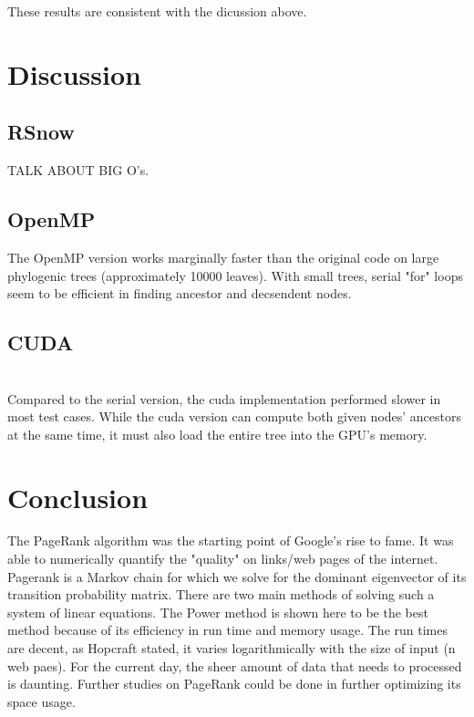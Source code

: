 \documentclass[11pt,letterpaper]{article}
\begin{document}
These results are consistent with the dicussion above. 

\section{Discussion}

\subsection{RSnow}
TALK ABOUT BIG O's.\\

\subsection{OpenMP}
The OpenMP version works marginally faster than the original code on large phylogenic trees (approximately 10000 leaves). With small trees, serial "for" loops seem to be efficient in finding ancestor and decsendent nodes. \\

\subsection{CUDA}

\\ Compared to the serial version, the cuda implementation performed slower in most test cases. While the cuda version can compute both given nodes' ancestors at the same time, it must also load the entire tree into the GPU’s memory.\\

\section{Conclusion}

The PageRank algorithm was the starting point of Google's rise to fame. It was able to numerically quantify the "quality" on links/web pages of the internet. Pagerank is a Markov chain for which we solve for the dominant eigenvector of its transition probability matrix. There are two main methods of solving such a system of linear equations. The Power method is shown here to be the best method because of its efficiency in run time and memory usage. The run times are decent, as Hopcraft stated, it varies logarithmically with the size of input (n web paes). For the current day, the sheer amount of data that needs to processed is daunting. Further studies on PageRank could be done in further optimizing its space usage. 
\end{document}
